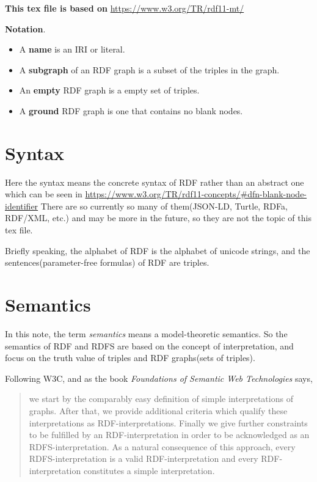 \documentclass{article}
\begin{document}
\textbf{This tex file is based on} \newline
\url{https://www.w3.org/TR/rdf11-mt/}\newline

 \textbf{Notation}.
\begin{itemize}
\item A \textbf{name} is an IRI or literal. 
\item A \textbf{subgraph} of an RDF graph is a subset of the triples in the graph. 
\item An \textbf{empty} RDF graph is a empty set of triples.
\item A \textbf{ground} RDF graph is one that contains no blank nodes.
\end{itemize}

\section{Syntax}
Here the syntax means the concrete syntax of RDF rather than an abstract one which can be seen in \newline
\url{https://www.w3.org/TR/rdf11-concepts/#dfn-blank-node-identifier}
\newline  There are so currently so many of them(JSON-LD, Turtle, RDFa, RDF/XML, etc.) and may be more in the future, so they are not the topic of this tex file.\newline

 Briefly speaking, the alphabet of RDF is the alphabet of unicode strings, and 
the sentences(parameter-free formulas) of RDF are triples.


\section{Semantics}

In this note, the term \textit{semantics} means a model-theoretic semantics. So the semantics of RDF and RDFS are based on the concept of interpretation, and focus on the truth value of triples and RDF graphs(sets of triples).

Following W3C, and as the book \textit{Foundations of Semantic Web Technologies} says\cite{book}, \newline
\begin{quotation}
we start by the comparably easy definition of simple interpretations of graphs. After that, we provide additional criteria which qualify these interpretations as RDF-interpretations. Finally we give further constraints to be fulfilled by an RDF-interpretation in order to be acknowledged as an RDFS-interpretation. As a natural consequence of this approach, every RDFS-interpretation is a valid RDF-interpretation and every RDF-interpretation constitutes a simple interpretation.
\end{quotation}
\newpage 
\end{document}
